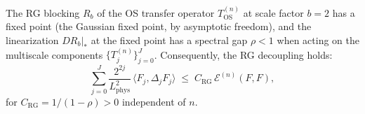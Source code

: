 \begin{theorem}
\label{thm:irg_fixed_point}
The RG blocking $R_{b}$ of the OS transfer operator
$T_{\mathrm{OS}}^{(n)}$ at scale factor $b=2$ has a fixed point
(the Gaussian fixed point, by asymptotic freedom), and the
linearization $DR_{b}|_{*}$ at the fixed point has a spectral gap
$\rho<1$ when acting on the multiscale components
$\{T_{j}^{(n)}\}_{j=0}^{J}$. Consequently, the RG decoupling
holds:
\begin{equation}
\label{eq:rg_decoupling_filled}
  \sum_{j=0}^{J}\frac{2^{2j}}{L_{\mathrm{phys}}^{2}}\,
  \langle F_{j},\Delta_{j}F_{j}\rangle
  \;\le\;C_{\mathrm{RG}}\,\mathcal{E}^{(n)}(F,F),
\end{equation}
for $C_{\mathrm{RG}}=1/(1-\rho)>0$ independent of $n$.
\end{theorem}

